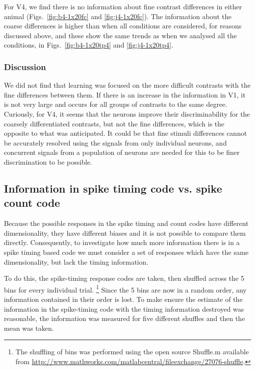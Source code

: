 For \ac{V4}, we find there is no information about fine contrast differences in either animal (Figs.~\ref{fig:b4-1x20fc} and \ref{fig:j4-1x20fc}).
The information about the coarse differences is higher than when all conditions are considered, for reasons discussed above, and these show the same trends as when we analysed all the conditions, in Figs.~\ref{fig:b4-1x20tp4} and \ref{fig:j4-1x20tp4}.


\subsubsection{Discussion}

We did not find that learning was focused on the more difficult contrasts with the fine differences between them.
If there is an increase in the information in \ac{V1}, it is not very large and occurs for all groups of contrasts to the same degree.
Curiously, for \ac{V4}, it seems that the neurons improve their discriminability for the coarsely differentiated contrasts, but not the fine differences, which is the opposite to what was anticipated.
It could be that fine stimuli differences cannot be accurately resolved using the signals from only individual neurons, and concurrent signals from a population of neurons are needed for this to be finer discrimination to be possible.


\subsection{Information in spike timing code vs. spike count code}

Because the possible responses in the spike timing and count codes have different dimensionality, they have different biases \citep{Panzeri2007} and it is not possible to compare them directly.
Consequently, to investigate how much more information there is in a spike timing based code we must consider a set of responses which have the same dimensionality, but lack the timing information.

To do this, the spike-timing response codes are taken, then shuffled across the 5 bins for every individual trial.%
\footnote{The shuffling of bins was performed using the open source Shuffle.m
available from \url{http://www.mathworks.com/matlabcentral/fileexchange/27076-shuffle}.}
Since the 5 bins are now in a random order, any information contained in their order is lost.
To make ensure the estimate of the information in the spike-timing code with the timing information destroyed was reasonable, the information was measured for five different shuffles%
 and then the mean was taken.

